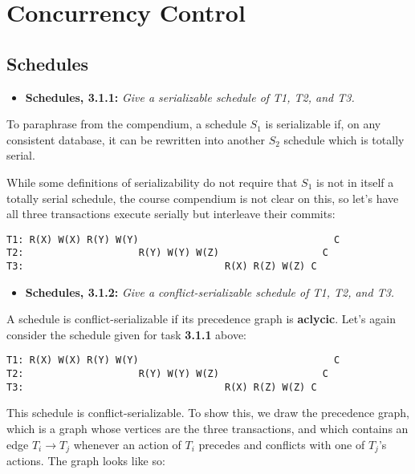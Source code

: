 \newpage
\section{Concurrency Control}

\subsection{Schedules}

\begin{itemize}
  \item \textbf{Schedules, 3.1.1:}
    \textit{Give a serializable schedule of T1, T2, and T3.}
\end{itemize}

To paraphrase from the compendium, a schedule $S_1$ is serializable if, on any
consistent database, it can be rewritten into another $S_2$ schedule which is
totally serial.
\smallskip

While some definitions of serializability do not require that
$S_1$ is not in itself a totally serial schedule, the course compendium is not
clear on this, so let's have all three transactions execute serially but
interleave their commits:

\begin{verbatim}
T1: R(X) W(X) R(Y) W(Y)                                  C
T2:                    R(Y) W(Y) W(Z)                  C
T3:                                   R(X) R(Z) W(Z) C
\end{verbatim}


\begin{itemize}
  \item \textbf{Schedules, 3.1.2:}
    \textit{Give a conflict-serializable schedule of T1, T2, and
    T3.}
\end{itemize}

A schedule is conflict-serializable if its precedence graph is \textbf{aclycic}.
Let's again consider the schedule given for task \textbf{3.1.1} above:

\begin{verbatim}
T1: R(X) W(X) R(Y) W(Y)                                  C
T2:                    R(Y) W(Y) W(Z)                  C
T3:                                   R(X) R(Z) W(Z) C
\end{verbatim}

This schedule is conflict-serializable. To show this, we draw the precedence
graph, which is a graph whose vertices are the three transactions, and which
contains an edge $T_i \to T_j$ whenever an action of $T_i$ precedes and
conflicts with one of $T_j$'s actions. The graph looks like so:

